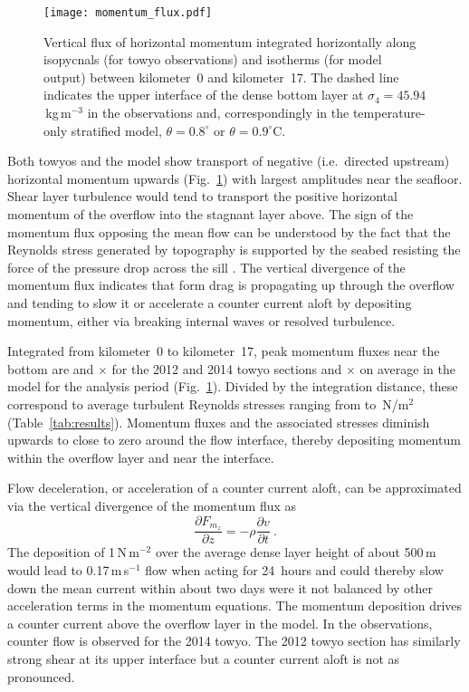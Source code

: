 \documentclass{ametsocV6.1}
\begin{document}
\begin{figure}
    \centerline{\texttt{[image: momentum\_flux.pdf]}}
\caption{
Vertical flux of horizontal momentum integrated horizontally along isopycnals (for towyo observations) and isotherms (for model output) between kilometer~0 and kilometer~17.
The dashed line indicates the upper interface of the dense bottom layer at $\sigma_4=45.94$\,kg\,m$^{-3}$ in the observations and, correspondingly in the temperature-only stratified model, $\theta=0.8^{\circ}$ or $\theta=0.9^{\circ}$C.
}
\label{fig:MomentumFlux}
\end{figure}

Both towyos and the model show transport of negative (i.e.~directed upstream) horizontal momentum upwards (Fig.~\ref{fig:MomentumFlux}) with largest amplitudes near the seafloor.
Shear layer turbulence would tend to transport the positive horizontal momentum of the overflow into the stagnant layer above.
The sign of the momentum flux opposing the mean flow can be understood by the fact that the Reynolds stress generated by topography is supported by the seabed resisting the force of the pressure drop across the sill \citep[e.g.][]{thorpe96}.
The vertical divergence of the momentum flux indicates that form drag is propagating up through the overflow and tending to slow it or accelerate a counter current aloft by depositing momentum, either via breaking internal waves or resolved turbulence.

Integrated from kilometer~0 to kilometer~17, peak momentum fluxes near the bottom are \TyAMomentumFlux{} and \TyBMomentumFlux$\times$\TyBMomentumFluxUnit{} for the 2012 and 2014 towyo sections and \ModelMomentumFlux$\times$\ModelMomentumFluxUnit{} on average in the model for the analysis period (Fig.~\ref{fig:MomentumFlux}).
Divided by the integration distance, these correspond to average turbulent Reynolds stresses ranging from \TyBMomentumFluxAverage{} to \ModelMomentumFluxStress\,N/m$^2$ (Table~\ref{tab:results}).
Momentum fluxes and the associated stresses diminish upwards to close to zero around the flow interface, thereby depositing momentum within the overflow layer and near the interface. 

Flow deceleration, or acceleration of a counter current aloft, can be approximated via the vertical divergence of the momentum flux as
\begin{equation}
    \frac{\partial F_{m_z}}{\partial z} = - \rho \frac{\partial v}{\partial t}\ .
\end{equation}
The deposition of 1\,N$\,$m$^{-2}$ over the average dense layer height of about 500\,m would lead to 0.17\,m\,s$^{-1}$ flow when acting for 24~hours and could thereby slow down the mean current within about two days were it not balanced by other acceleration terms in the momentum equations. 
The momentum deposition drives a counter current above the overflow layer in the model.
In the observations, counter flow is observed for the 2014 towyo.
The 2012 towyo section has similarly strong shear at its upper interface but a counter current aloft is not as pronounced.
\end{document}
